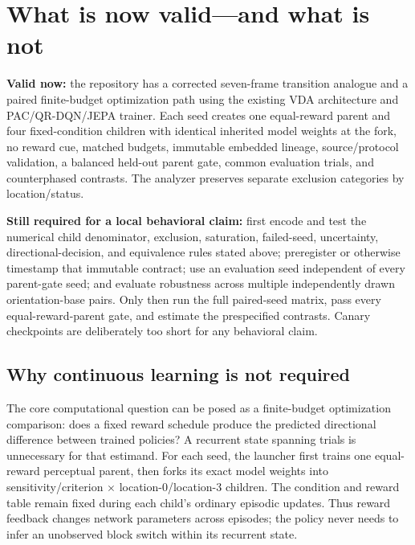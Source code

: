 \documentclass[10pt]{article}
\begin{document}
\section{What is now valid---and what is not}

\colorbox{good}{\parbox{0.96\linewidth}{
\textbf{Valid now:} the repository has a corrected seven-frame transition analogue and a paired finite-budget optimization path using the existing VDA architecture and PAC/QR-DQN/JEPA trainer. Each seed creates one equal-reward parent and four fixed-condition children with identical inherited model weights at the fork, no reward cue, matched budgets, immutable embedded lineage, source/protocol validation, a balanced held-out parent gate, common evaluation trials, and counterphased contrasts. The analyzer preserves separate exclusion categories by location/status.
}}

\colorbox{warn}{\parbox{0.96\linewidth}{
\textbf{Still required for a local behavioral claim:} first encode and test the numerical child denominator, exclusion, saturation, failed-seed, uncertainty, directional-decision, and equivalence rules stated above; preregister or otherwise timestamp that immutable contract; use an evaluation seed independent of every parent-gate seed; and evaluate robustness across multiple independently drawn orientation-base pairs. Only then run the full paired-seed matrix, pass every equal-reward-parent gate, and estimate the prespecified contrasts. Canary checkpoints are deliberately too short for any behavioral claim.
}}

\subsection{Why continuous learning is not required}

The core computational question can be posed as a finite-budget optimization comparison: does a fixed reward schedule produce the predicted directional difference between trained policies? A recurrent state spanning trials is unnecessary for that estimand. For each seed, the launcher first trains one equal-reward perceptual parent, then forks its exact model weights into sensitivity/criterion $\times$ location-0/location-3 children. The condition and reward table remain fixed during each child's ordinary episodic updates. Thus reward feedback changes network parameters across episodes; the policy never needs to infer an unobserved block switch within its recurrent state.
\end{document}
